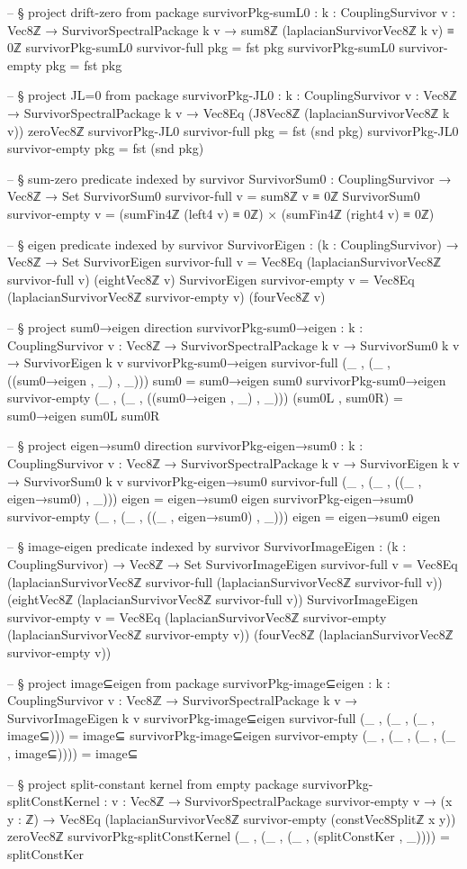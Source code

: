 \documentclass[11pt,a4paper]{book}
\begin{document}
\begin{code}
-- § project drift-zero from package
survivorPkg-sumL0 : {k : CouplingSurvivor} {v : Vec8ℤ} →
  SurvivorSpectralPackage k v → sum8ℤ (laplacianSurvivorVec8ℤ k v) ≡ 0ℤ
survivorPkg-sumL0 {survivor-full} pkg = fst pkg
survivorPkg-sumL0 {survivor-empty} pkg = fst pkg

-- § project JL=0 from package
survivorPkg-JL0 : {k : CouplingSurvivor} {v : Vec8ℤ} →
  SurvivorSpectralPackage k v → Vec8Eq (J8Vec8ℤ (laplacianSurvivorVec8ℤ k v)) zeroVec8ℤ
survivorPkg-JL0 {survivor-full} pkg = fst (snd pkg)
survivorPkg-JL0 {survivor-empty} pkg = fst (snd pkg)

-- § sum-zero predicate indexed by survivor
SurvivorSum0 : CouplingSurvivor → Vec8ℤ → Set
SurvivorSum0 survivor-full v = sum8ℤ v ≡ 0ℤ
SurvivorSum0 survivor-empty v = (sumFin4ℤ (left4 v) ≡ 0ℤ) × (sumFin4ℤ (right4 v) ≡ 0ℤ)

-- § eigen predicate indexed by survivor
SurvivorEigen : (k : CouplingSurvivor) → Vec8ℤ → Set
SurvivorEigen survivor-full v =
  Vec8Eq (laplacianSurvivorVec8ℤ survivor-full v) (eightVec8ℤ v)
SurvivorEigen survivor-empty v =
  Vec8Eq (laplacianSurvivorVec8ℤ survivor-empty v) (fourVec8ℤ v)

-- § project sum0→eigen direction
survivorPkg-sum0→eigen : {k : CouplingSurvivor} {v : Vec8ℤ} →
  SurvivorSpectralPackage k v → SurvivorSum0 k v → SurvivorEigen k v
survivorPkg-sum0→eigen {survivor-full} (_ , (_ , ((sum0→eigen , _) , _))) sum0 = sum0→eigen sum0
survivorPkg-sum0→eigen {survivor-empty} (_ , (_ , ((sum0→eigen , _) , _))) (sum0L , sum0R) = sum0→eigen sum0L sum0R

-- § project eigen→sum0 direction
survivorPkg-eigen→sum0 : {k : CouplingSurvivor} {v : Vec8ℤ} →
  SurvivorSpectralPackage k v → SurvivorEigen k v → SurvivorSum0 k v
survivorPkg-eigen→sum0 {survivor-full} (_ , (_ , ((_ , eigen→sum0) , _))) eigen = eigen→sum0 eigen
survivorPkg-eigen→sum0 {survivor-empty} (_ , (_ , ((_ , eigen→sum0) , _))) eigen = eigen→sum0 eigen

-- § image-eigen predicate indexed by survivor
SurvivorImageEigen : (k : CouplingSurvivor) → Vec8ℤ → Set
SurvivorImageEigen survivor-full v =
  Vec8Eq (laplacianSurvivorVec8ℤ survivor-full (laplacianSurvivorVec8ℤ survivor-full v))
        (eightVec8ℤ (laplacianSurvivorVec8ℤ survivor-full v))
SurvivorImageEigen survivor-empty v =
  Vec8Eq (laplacianSurvivorVec8ℤ survivor-empty (laplacianSurvivorVec8ℤ survivor-empty v))
        (fourVec8ℤ (laplacianSurvivorVec8ℤ survivor-empty v))

-- § project image⊆eigen from package
survivorPkg-image⊆eigen : {k : CouplingSurvivor} {v : Vec8ℤ} →
  SurvivorSpectralPackage k v → SurvivorImageEigen k v
survivorPkg-image⊆eigen {survivor-full} (_ , (_ , (_ , image⊆))) = image⊆
survivorPkg-image⊆eigen {survivor-empty} (_ , (_ , (_ , (_ , image⊆)))) = image⊆

-- § project split-constant kernel from empty package
survivorPkg-splitConstKernel : {v : Vec8ℤ} →
  SurvivorSpectralPackage survivor-empty v → (x y : ℤ) →
  Vec8Eq (laplacianSurvivorVec8ℤ survivor-empty (constVec8Splitℤ x y)) zeroVec8ℤ
survivorPkg-splitConstKernel (_ , (_ , (_ , (splitConstKer , _)))) = splitConstKer
\end{code}
\end{document}
